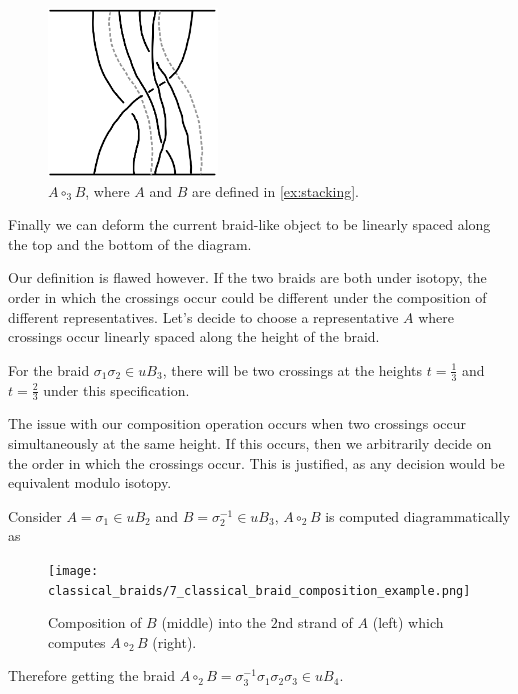 \begin{figure}[H]
    \centering
    \includegraphics[width=0.4\textwidth]{images/classical_braids/6_classical_braid_composition.png}
    \caption{\( A \circ_3 B \), where \( A \) and \( B \) are defined in \cref{ex:stacking}.}
    \label{fig:classical_composition}
\end{figure}

Finally we can deform the current braid-like object to be linearly spaced along the top and the bottom of the diagram. 

Our definition is flawed however.
If the two braids are both under isotopy, the order in which the crossings occur could be different under the composition of different representatives. 
Let's decide to choose a representative \( A \) where crossings occur linearly spaced along the height of the braid. 
\begin{Example}
For the braid \( \sigma_1 \sigma_2 \in uB_3 \), there will be two crossings at the heights \( t = \frac{1}{3} \) and \( t = \frac{2}{3} \) under this specification. 
\end{Example}
The issue with our composition operation occurs when two crossings occur simultaneously at the same height. 
If this occurs, then we arbitrarily decide on the order in which the crossings occur. 
This is justified, as any decision would be equivalent modulo isotopy. 

\begin{Example}
    Consider \( A = \sigma_1 \in uB_2 \) and \( B = \sigma_2^{-1} \in uB_3 \), \( A \circ_2 B \) is computed diagrammatically as

    \begin{figure}[H]
    \centering
    \texttt{[image: classical\_braids/7\_classical\_braid\_composition\_example.png]}
    \caption{Composition of \( B \) (middle) into the \( 2 \)nd strand of \( A \) (left) which computes \( A \circ_2 B \) (right).}
\end{figure}

    Therefore getting the braid \( A \circ_2 B = \sigma_3^{-1} \sigma_1 \sigma_2 \sigma_3 \in uB_4 \). 
\end{Example}

